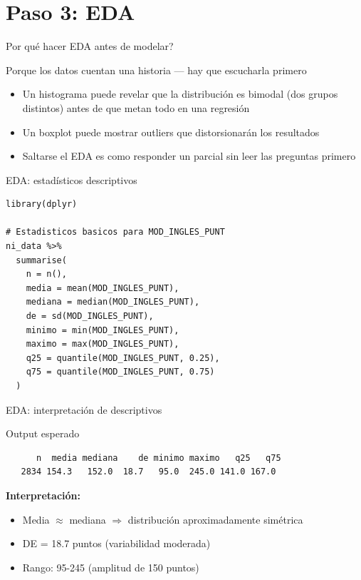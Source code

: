 \documentclass[aspectratio=169, 11pt]{beamer}
\begin{document}
\section{Paso 3: EDA}

\begin{frame}{\textquestiondown{}Por qu\'e hacer EDA antes de modelar?}
\begin{exampleblock}{Porque los datos cuentan una historia --- hay que escucharla primero}
\small
\begin{itemize}\setlength{\itemsep}{2pt}
  \item Un histograma puede revelar que la distribuci\'on es bimodal (dos grupos distintos) antes de que metan todo en una regresi\'on
  \item Un boxplot puede mostrar outliers que distorsionar\'an los resultados
  \item Saltarse el EDA es como responder un parcial sin leer las preguntas primero
\end{itemize}
\end{exampleblock}
\end{frame}

\begin{frame}[fragile]{EDA: estadísticos descriptivos}
\begin{lstlisting}
library(dplyr)

# Estadisticos basicos para MOD_INGLES_PUNT
ni_data %>%
  summarise(
    n = n(),
    media = mean(MOD_INGLES_PUNT),
    mediana = median(MOD_INGLES_PUNT),
    de = sd(MOD_INGLES_PUNT),
    minimo = min(MOD_INGLES_PUNT),
    maximo = max(MOD_INGLES_PUNT),
    q25 = quantile(MOD_INGLES_PUNT, 0.25),
    q75 = quantile(MOD_INGLES_PUNT, 0.75)
  )
\end{lstlisting}
\end{frame}

\begin{frame}[fragile]{EDA: interpretación de descriptivos}
\begin{exampleblock}{Output esperado}
\small
\begin{verbatim}
      n  media mediana    de minimo maximo   q25   q75
   2834 154.3   152.0  18.7   95.0  245.0 141.0 167.0
\end{verbatim}
\end{exampleblock}

\vspace{0.3cm}
\textbf{Interpretación:}
\begin{itemize}
\item Media $\approx$ mediana $\Rightarrow$ distribución aproximadamente simétrica
\item DE = 18.7 puntos (variabilidad moderada)
\item Rango: 95-245 (amplitud de 150 puntos)
\end{itemize}
\end{frame}
\end{document}
